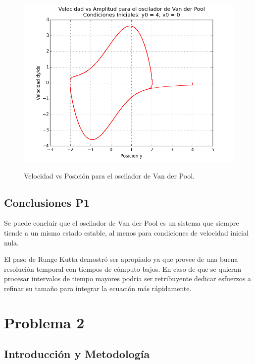 \documentclass{article}
\begin{document}
\begin{figure}[h]
  \centering
  \includegraphics[scale = 0.4]{images/vel_vs_amplitud_4-0.png}
  \label{}
  \caption{Velocidad vs Posici\'on para el oscilador de Van der Pool.}
\end{figure}

 \subsection{Conclusiones P1}
 
 Se puede concluir que el oscilador de Van der Pool es un sistema que siempre tiende a un mismo estado estable, al menos para condiciones de velocidad inicial nula.
 
 El paso de Runge Kutta demostr\'o ser apropiado ya que provee de una buena resoluci\'on temporal con tiempos de c\'omputo bajos. En caso de que se quieran procesar intervalos de tiempo mayores podr\'ia ser retribuyente dedicar esfuerzos a refinar su tamaño para integrar la ecuaci\'on m\'as r\'apidamente.
 
\clearpage
\section{Problema 2}

\subsection{Introducci\'on y Metodolog\'ia}
\end{document}
